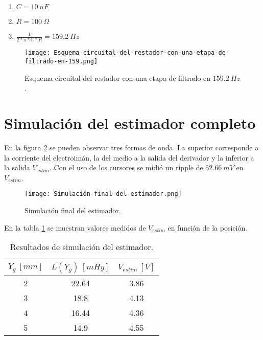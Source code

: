 \begin{enumerate}
	\item  $C=10\: nF$
	
	\item  $R=100\:\Omega$
	
	\item  $\frac{1}{2*\pi *C*R}=159.2\: Hz$
\end{enumerate}

\begin{figure}[H]
	\centering
	\texttt{[image: Esquema-circuital-del-restador-con-una-etapa-de-filtrado-en-159.png]}
	\caption{Esquema circuital del restador con una etapa de filtrado en $159.2\: Hz$.}
	\label{fig:img_Esquema-circuital-del-restador-con-una-etapa-de-filtrado-en-159}
\end{figure}

\section{Simulaci\'{o}n del estimador completo}

\noindent En la figura \ref{fig:img_Simulación_final_del_estimado} se pueden observar tres formas de onda. La superior corresponde a la corriente del electroim\'{a}n, la del medio a la salida del derivador y la inferior a la salida $V_{estim}$. Con el uso de los cursores se midi\'{o} un ripple de $52.66\:mV $ en $V_{estim}$.

\begin{figure}[H]
	\centering
	\texttt{[image: Simulación-final-del-estimador.png]}
	\caption{Simulación final del estimador.}
	\label{fig:img_Simulación_final_del_estimado}
\end{figure}

\noindent En la tabla \ref{tab_Resultados_de_simulación_del_estimador} se muestran valores medidos de $V_{estim}$ en funci\'{o}n de la posici\'{o}n.

\begin{table}[H]
	\begin{center}
		\begin{tabular}{| c | c | c |}
			\hline
		$Y_g\:[mm]$ & $L(Y_g)\:[mHy]$ & $V_{estim}\:[V]$ \\ \hline 
		2 & 22.64 & 3.86 \\ \hline 
		3 & 18.8 & 4.13 \\ \hline 
		4 & 16.44 & 4.36 \\ \hline 
		5 & 14.9 & 4.55 \\ \hline 
		\end{tabular}
		\caption{Resultados de simulación del estimador.}
		\label{tab_Resultados_de_simulación_del_estimador}
	\end{center}
\end{table}

